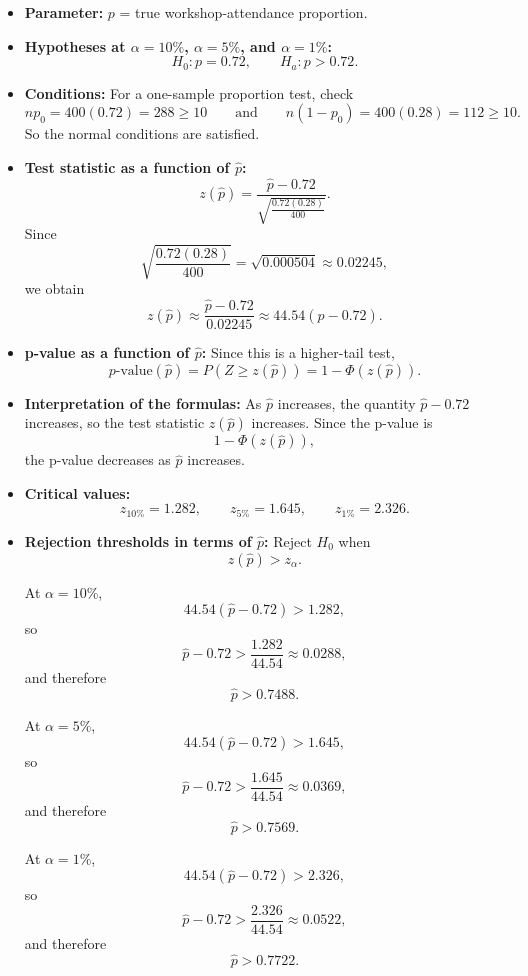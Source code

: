 \begin{itemize}
	\item \textbf{Parameter:} \(p\) = true workshop-attendance proportion.
	
	\item \textbf{Hypotheses at \(\alpha=10\%\), \(\alpha=5\%\), and \(\alpha=1\%\):}
	\[
	H_0\colon p=0.72,
	\qquad
	H_a\colon p>0.72.
	\]
	
	\item \textbf{Conditions:} For a one-sample proportion test, check
	\[
	np_0=400(0.72)=288\ge10
	\qquad\text{and}\qquad
	n(1-p_0)=400(0.28)=112\ge10.
	\]
	So the normal conditions are satisfied.
	
	\item \textbf{Test statistic as a function of \(\hat p\):}
	\[
	z(\hat p)=\frac{\hat p-0.72}{\sqrt{\frac{0.72(0.28)}{400}}}.
	\]
	Since
	\[
	\sqrt{\frac{0.72(0.28)}{400}}=\sqrt{0.000504}\approx 0.02245,
	\]
	we obtain
	\[
	z(\hat p)\approx \frac{\hat p-0.72}{0.02245}
	\approx 44.54(\hat p-0.72).
	\]
	
	\item \textbf{p-value as a function of \(\hat p\):} Since this is a higher-tail test,
	\[
	p\text{-value}(\hat p)=P(Z\ge z(\hat p))=1-\Phi(z(\hat p)).
	\]
	
	\item \textbf{Interpretation of the formulas:} As \(\hat p\) increases, the quantity \(\hat p-0.72\) increases, so the test statistic \(z(\hat p)\) increases. Since the p-value is
	\[
	1-\Phi(z(\hat p)),
	\]
	the p-value decreases as \(\hat p\) increases.
	
	\item \textbf{Critical values:}
	\[
	z_{10\%}=1.282,
	\qquad
	z_{5\%}=1.645,
	\qquad
	z_{1\%}=2.326.
	\]
	
	\item \textbf{Rejection thresholds in terms of \(\hat p\):} Reject \(H_0\) when
	\[
	z(\hat p)>z_\alpha.
	\]
	
	At \(\alpha=10\%\),
	\[
	44.54(\hat p-0.72)>1.282,
	\]
	so
	\[
	\hat p-0.72>\frac{1.282}{44.54}\approx 0.0288,
	\]
	and therefore
	\[
	\hat p>0.7488.
	\]
	
	At \(\alpha=5\%\),
	\[
	44.54(\hat p-0.72)>1.645,
	\]
	so
	\[
	\hat p-0.72>\frac{1.645}{44.54}\approx 0.0369,
	\]
	and therefore
	\[
	\hat p>0.7569.
	\]
	
	At \(\alpha=1\%\),
	\[
	44.54(\hat p-0.72)>2.326,
	\]
	so
	\[
	\hat p-0.72>\frac{2.326}{44.54}\approx 0.0522,
	\]
	and therefore
	\[
	\hat p>0.7722.
	\]
	

\end{itemize}
